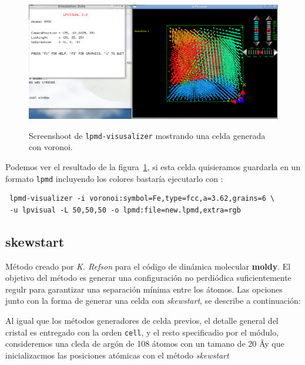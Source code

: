 \begin{figure}[h!]
 \centering
 \includegraphics[scale=.35]{voronoi-1.png}
 \label{fig:voronoi-1}
 \caption{Screenshoot de \texttt{lpmd-visusalizer} mostrando una celda generada con voronoi.}
\end{figure}

Podemos ver el resultado de la figura~\ref{fig:voronoi-1}, si esta celda quisieramos guardarla en un formato \verb|lpmd| incluyendo los colores bastar\'ia ejecutarlo con :

 \begin{verbatim}
 lpmd-visualizer -i voronoi:symbol=Fe,type=fcc,a=3.62,grains=6 \
 -u lpvisual -L 50,50,50 -o lpmd:file=new.lpmd,extra=rgb
\end{verbatim}



\subsection{skewstart}
M\'etodo creado por \textit{K. Refson} para el c\'odigo de din\'amica molecular \textbf{moldy}. El objetivo del m\'etodo es generar una configuraci\'on no perdi\'odica suficientemente regulr para garantizar una separaci\'on m\'inima entre los \'atomos. Las opciones junto con la forma de generar una celda con \textit{skewstart}, se describe a continuaci\'on:


Al igual que los m\'etodos generadores de celda previos, el detalle general del cristal es entregado con la orden \verb|cell|, y el resto specificadio por el m\'odulo, consideremos una cleda de arg\'on de 108 \'atomos con un tamano de 20 \AA y que inicializacmos las posiciones at\'omicas con el m\'etodo \textit{skewstart}

